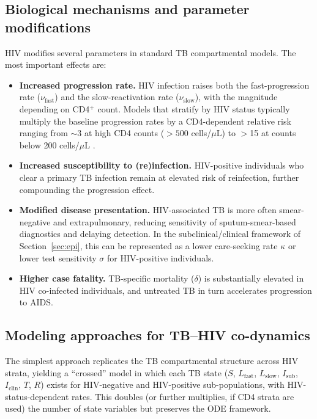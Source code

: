 \documentclass[11pt]{article}
\begin{document}
\subsection{Biological mechanisms and parameter modifications}

HIV modifies several parameters in standard TB compartmental models. The most important effects are:

\begin{itemize}
  \item \textbf{Increased progression rate.} HIV infection raises both the fast-progression rate ($\nu_\text{fast}$) and the slow-reactivation rate ($\nu_\text{slow}$), with the magnitude depending on CD4$^+$ count. Models that stratify by HIV status typically multiply the baseline progression rates by a CD4-dependent relative risk ranging from $\sim$3 at high CD4 counts ($>500$ cells/$\mu$L) to $>$15 at counts below 200 cells/$\mu$L \citep{williams2003antiretroviral}.
  \item \textbf{Increased susceptibility to (re)infection.} HIV-positive individuals who clear a primary TB infection remain at elevated risk of reinfection, further compounding the progression effect.
  \item \textbf{Modified disease presentation.} HIV-associated TB is more often smear-negative and extrapulmonary, reducing sensitivity of sputum-smear-based diagnostics and delaying detection. In the subclinical/clinical framework of Section~\ref{sec:epi}, this can be represented as a lower care-seeking rate $\kappa$ or lower test sensitivity $\sigma$ for HIV-positive individuals.
  \item \textbf{Higher case fatality.} TB-specific mortality ($\delta$) is substantially elevated in HIV co-infected individuals, and untreated TB in turn accelerates progression to AIDS.
\end{itemize}

\subsection{Modeling approaches for TB--HIV co-dynamics}

The simplest approach replicates the TB compartmental structure across HIV strata, yielding a ``crossed'' model in which each TB state ($S$, $L_\text{fast}$, $L_\text{slow}$, $I_\text{sub}$, $I_\text{clin}$, $T$, $R$) exists for HIV-negative and HIV-positive sub-populations, with HIV-status-dependent rates. This doubles (or further multiplies, if CD4 strata are used) the number of state variables but preserves the ODE framework.
\end{document}

